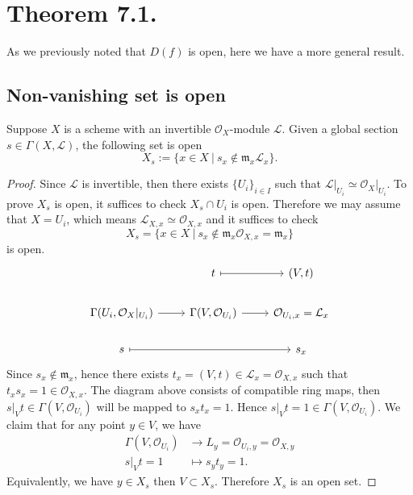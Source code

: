 \section{Theorem 7.1.}

As we previously noted that $D(f)$ is open, here we have a more general result. 
\subsection*{Non-vanishing set is open}
\begin{proposition}
    Suppose $X$ is a scheme with an invertible $\mathcal O_X$-module $\mathcal L$. Given a global section $s\in\Gamma(X,\mathcal L)$, the following set is open
    \[X_s:=\{x\in X ~\vert~ s_x \notin \mathfrak m_x\mathcal L_x\}.\]
\end{proposition}
\begin{proof}
    Since $\mathcal L$ is invertible, then there exists $\{U_i\}_{i\in I}$ such that $\mathcal L\vert_{U_i}\simeq \mathcal O_{X}\vert_{U_i}$. To prove $X_s$ is open, it suffices to check $X_s\cap U_i$ is open. Therefore we may assume that $X=U_i$, which means $\mathcal L_{X,x}\simeq \mathcal O_{X,x}$ and it suffices to check 
    \[X_s=\{x\in X~\vert~ s_x\notin \mathfrak m _x\mathcal O_{X,x}=\mathfrak m _x\}\] is open. 
    \[%
    \begin{tikzcd}
                                                     & t \arrow[r, maps to]                   & {(V,t)}                           \\
    {\Gamma(U_i,\mathcal O_X \vert_{U_i})} \arrow[r] & {\Gamma(V,\mathcal O_{U_i})} \arrow[r] & {\mathcal O_{U_i,x}=\mathcal L_x} \\
    s \arrow[rr, maps to]                            &                                        & s_x                              
    \end{tikzcd}\]
    Since $s_x\notin \mathfrak m_x$, hence there exists $t_x=(V,t)\in \mathcal L_x=\mathcal O_{X,x}$ such that $t_xs_x=1\in\mathcal O_{X,x}$. The diagram above consists of compatible ring maps, then $s\vert_V t \in \Gamma(V,\mathcal O_{U_i})$ will be mapped to $s_xt_x=1$. Hence $s\vert_V t=1\in \Gamma(V,\mathcal O_{U_i})$. 
    We claim that for any point $y\in V$, we have \begin{align*}
        \Gamma(V,\mathcal O_{U_i}) &\to L_y=\mathcal O_{U_i,y}=\mathcal O_{X,y}\\
        s\vert_V t =1 &\mapsto s_yt_y=1.
    \end{align*}
    Equivalently, we have $y\in X_s$ then $V\subset X_s$. Therefore $X_s$ is an open set. 
\end{proof}
